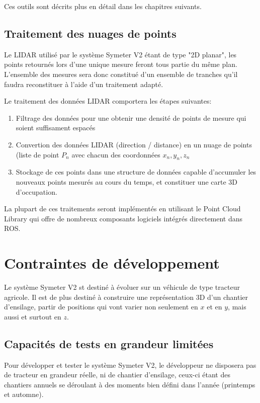 \documentclass[12pt,a4paper]{report}
\begin{document}
   \para Ces outils sont décrits plus en détail dans les chapitres suivants.
		
			
		
			
		
		\subsection{Traitement des nuages de points}
		Le LIDAR utilisé par le système Symeter V2 étant de type "2D planar", les points retournés lors d'une unique mesure feront tous partie du même plan. L'ensemble des mesures sera donc constitué d'un ensemble de tranches qu'il faudra reconstituer à l'aide d'un traitement adapté.
		
		\para Le traitement des données LIDAR comportera les étapes suivantes:
		\begin{enumerate}
			\item Filtrage des données pour une obtenir une densité de points de mesure qui soient suffisament espacés
			\item Convertion des données LIDAR (direction / distance) en un nuage de points (liste de point $P_n$ avec chacun des coordonnées $x_n, y_n, z_n$
			\item Stockage de ces points dans une structure de données capable d'accumuler les nouveaux points mesurés au cours du temps, et constituer une carte 3D d'occupation.
 		\end{enumerate}
 	
 		\para La plupart de ces traitements seront implémentés en utilisant le Point Cloud Library qui offre de nombreux composants logiciels intégrés directement dans ROS.

			
	\section{Contraintes de développement}
		Le système Symeter V2 st destiné à évoluer sur un véhicule de type tracteur agricole. Il est de plus destiné à construire une représentation 3D d'un chantier d'ensilage, partir de positions qui vont varier non seulement en $x$ et en $y$, mais aussi et surtout en $z$.
		
		\subsection{Capacités de tests en grandeur limitées}
		Pour développer et tester le système Symeter V2, le développeur ne disposera pas de tracteur en grandeur réelle, ni de chantier d'ensilage, ceux-ci étant des chantiers annuels se déroulant à des moments bien défini dans l'année (printemps et automne).
		
\end{document}
